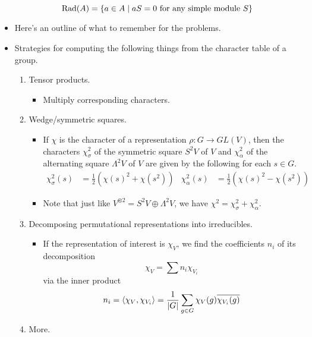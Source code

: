 \documentclass[../notes.tex]{subfiles}
\begin{document}
\begin{itemize}
\begin{equation*}
        \operatorname{Rad}(A) = \{a\in A\mid aS=0\text{ for any simple module }S\}
    \end{equation*}
    \item Here's an outline of what to remember for the problems.
    \item Strategies for computing the following things from the character table of a group.
    \begin{enumerate}
        \item Tensor products.
        \begin{itemize}
            \item Multiply corresponding characters.
        \end{itemize}
        \item Wedge/symmetric squares.
        \begin{itemize}
            \item If $\chi$ is the character of a representation $\rho:G\to GL(V)$, then the characters $\chi_\sigma^2$ of the symmetric square $S^2V$ of $V$ and $\chi_\alpha^2$ of the alternating square $\Lambda^2V$ of $V$ are given by the following for each $s\in G$.
            \begin{align*}
                \chi_\sigma^2(s) &= \frac{1}{2}\left( \chi(s)^2+\chi(s^2) \right)&
                \chi_\alpha^2(s) &= \frac{1}{2}\left( \chi(s)^2-\chi(s^2) \right)
            \end{align*}
            \item Note that just like $V^{\otimes 2}=S^2V\oplus\Lambda^2V$, we have $\chi^2=\chi_\sigma^2+\chi_\alpha^2$.
        \end{itemize}
        \item Decomposing permutational representations into irreducibles.
        \begin{itemize}
            \item If the representation of interest is $\chi_V$, we find the coefficients $n_i$ of its decomposition
            \begin{equation*}
                \chi_V = \sum n_i\chi_{V_i}
            \end{equation*}
            via the inner product
            \begin{equation*}
                n_i = \left\langle{\chi_V,\chi_{V_i}}\right\rangle = \frac{1}{|G|}\sum_{g\in G}\chi_V(g)\overline{\chi_{V_i}(g)}
            \end{equation*}
        \end{itemize}
        \item More.

\end{enumerate}
\end{itemize}
\end{document}
